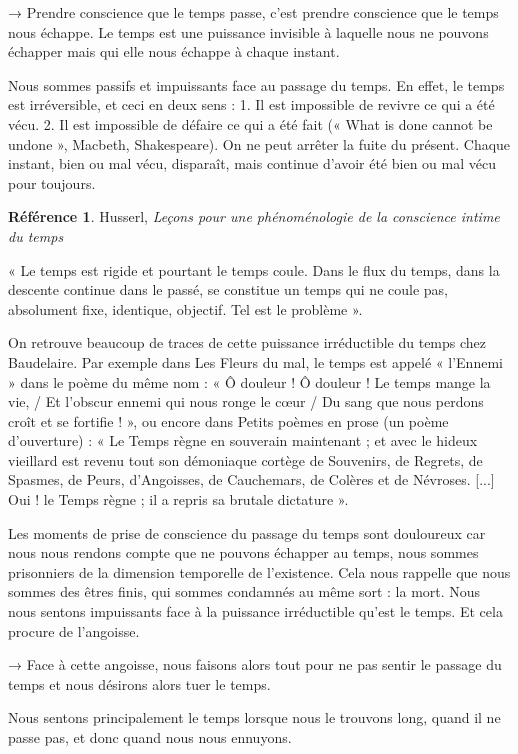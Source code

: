 \documentclass[french]{book}
\theoremstyle{definition}
\newtheorem*{refe}{Référence}
\begin{document}
→ Prendre conscience que le temps passe, c’est prendre conscience que le temps nous échappe. Le temps est une puissance invisible à laquelle nous ne pouvons échapper mais qui elle nous échappe à chaque instant.

Nous sommes passifs et impuissants face au passage du temps. En effet, le temps est irréversible, et ceci en deux sens : 1. Il est impossible de revivre ce qui a été vécu. 2. Il est impossible de défaire ce qui a été fait (« What is done cannot be undone », Macbeth, Shakespeare). On ne peut arrêter la fuite du présent. Chaque instant, bien ou mal vécu, disparaît, mais continue d’avoir été bien ou mal vécu pour toujours.

\begin{refe}
	Husserl, \textit{Leçons pour une phénoménologie de la conscience intime du temps}
\end{refe}
« Le temps est rigide et pourtant le temps coule. Dans le flux du temps, dans la descente continue dans le passé, se constitue un temps qui ne coule pas, absolument fixe, identique, objectif. Tel est le problème ».

On retrouve beaucoup de traces de cette puissance irréductible du temps chez Baudelaire. Par exemple dans Les Fleurs du mal, le temps est appelé « l’Ennemi » dans le poème du même nom : « Ô douleur ! Ô douleur ! Le temps mange la vie, / Et l'obscur ennemi qui nous ronge le cœur / Du sang que nous perdons croît et se fortifie ! », ou encore dans Petits poèmes en prose (un poème d’ouverture) : « Le Temps règne en souverain maintenant ; et avec le hideux vieillard est revenu tout son démoniaque cortège de Souvenirs, de Regrets, de Spasmes, de Peurs, d’Angoisses, de Cauchemars, de Colères et de Névroses. [...] Oui ! le Temps règne ; il a repris sa brutale dictature ».

Les moments de prise de conscience du passage du temps sont douloureux car nous nous rendons compte que ne pouvons échapper au temps, nous sommes prisonniers de la dimension temporelle de l’existence. Cela nous rappelle que nous sommes des êtres finis, qui sommes condamnés au même sort : la mort. Nous nous sentons impuissants face à la puissance irréductible qu’est le temps. Et cela procure de l’angoisse.

→ Face à cette angoisse, nous faisons alors tout pour ne pas sentir le passage du temps et nous désirons alors tuer le temps.

Nous sentons principalement le temps lorsque nous le trouvons long, quand il ne passe pas, et donc quand nous nous ennuyons.
\end{document}
